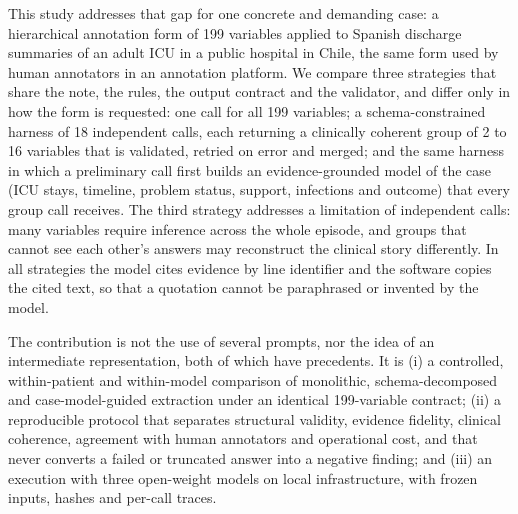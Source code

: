 This study addresses that gap for one concrete and demanding case: a hierarchical annotation form
of 199 variables applied to Spanish discharge summaries of an adult ICU in a public hospital in Chile, the
same form used by human annotators in an annotation platform. We compare three strategies that share the
note, the rules, the output contract and the validator, and differ only in how the form is requested: one
call for all 199 variables; a schema-constrained harness of 18 independent calls, each returning a clinically
coherent group of 2 to 16 variables that is validated, retried on error and merged; and the same harness in
which a preliminary call first builds an evidence-grounded model of the case (ICU stays, timeline, problem
status, support, infections and outcome) that every group call receives. The third strategy addresses a
limitation of independent calls: many variables require inference across the whole episode, and groups that
cannot see each other's answers may reconstruct the clinical story differently. In all strategies the model
cites evidence by line identifier and the software copies the cited text, so that a quotation cannot be
paraphrased or invented by the model.

The contribution is not the use of several prompts, nor the idea of an intermediate representation, both of
which have precedents. It is (i) a controlled, within-patient and within-model comparison of monolithic,
schema-decomposed and case-model-guided extraction under an identical 199-variable contract; (ii) a
reproducible protocol that separates structural validity, evidence fidelity, clinical coherence, agreement
with human annotators and operational cost, and that never converts a failed or truncated answer into a
negative finding; and (iii) an execution with three open-weight models on local infrastructure, with frozen
inputs, hashes and per-call traces.
